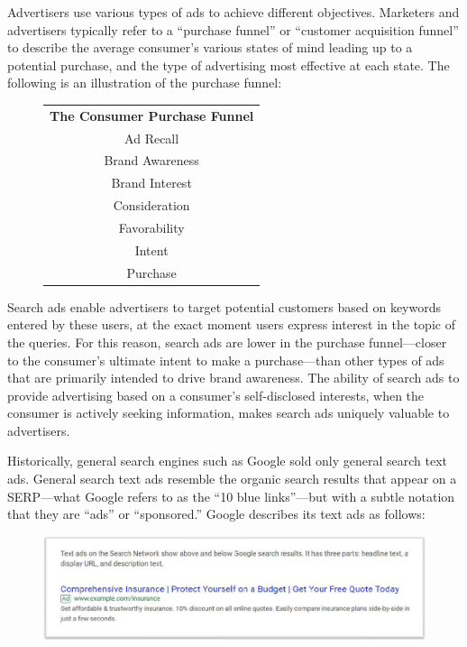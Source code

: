 \documentclass[11pt,b5paper,headings=small]{scrartcl}
\begin{document}

Advertisers use various types of ads to achieve different objectives. Marketers and
advertisers typically refer to a “purchase funnel” or “customer acquisition funnel” to describe the
average consumer’s various states of mind leading up to a potential purchase, and the type of
advertising most effective at each state. The following is an illustration of the purchase funnel:

\begin{figure}[h]
\centering
\sffamily
\caption{}
\begin{tabular}{c}
\textbf{The Consumer Purchase Funnel}\\
Ad Recall \\
Brand Awareness \\
Brand Interest \\
Consideration \\
Favorability \\
Intent \\
Purchase
\end{tabular}
\end{figure}


Search ads enable advertisers to target potential customers based on keywords
entered by these users, at the exact moment users express interest in the topic of the queries. For
this reason, search ads are lower in the purchase funnel—closer to the consumer’s ultimate intent
to make a purchase—than other types of ads that are primarily intended to drive brand
awareness. The ability of search ads to provide advertising based on a consumer’s self-disclosed
interests, when the consumer is actively seeking information, makes search ads uniquely
valuable to advertisers.


Historically, general search engines such as Google sold only general search text
ads. General search text ads resemble the organic search results that appear on a SERP—what
Google refers to as the “10 blue links”—but with a subtle notation that they are “ads” or
“sponsored.” Google describes its text ads as follows:

\begin{figure}[!ht]
\caption{}
\includegraphics{US-v-Google-Complaint-figures/fig2.png}
\end{figure}
\end{document}

